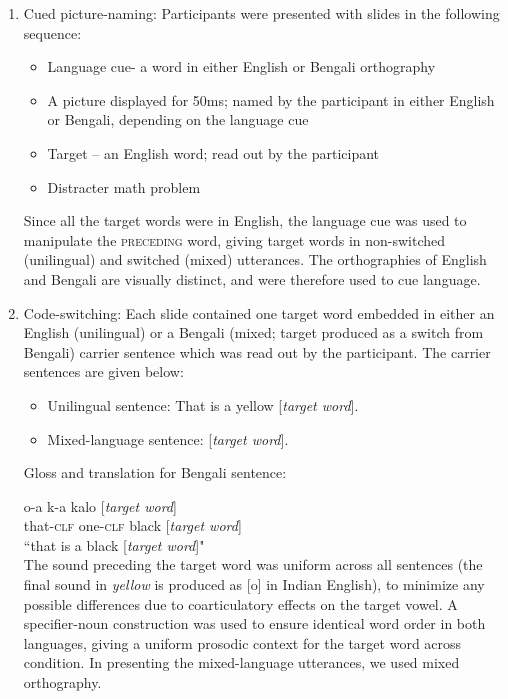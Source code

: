 \documentclass[12 pt]{article}
\begin{document}
\begin{enumerate}[]
	\item Cued picture-naming: Participants were presented with slides in the following sequence:
	\begin{itemize}
		\item Language cue- a word in either English or Bengali orthography
		\item A picture displayed for 50ms; named by the participant in either English or Bengali, depending on the language cue 
		\item Target -- an English word; read out by the participant
		\item Distracter math problem
	\end{itemize}
	Since all the target words were in English, the language cue was used to manipulate the \textsc{preceding} word, giving target words in non-switched (unilingual) and switched (mixed) utterances. The orthographies of English and Bengali are visually distinct, and were therefore used to cue language.
	
	\item Code-switching: Each slide contained one target word embedded in either an English (unilingual) or a Bengali (mixed; target produced as a switch from Bengali) carrier sentence which was read out by the participant. The carrier sentences are given below:
	\begin{itemize}
		\item Unilingual sentence: That is a yellow [\textit{target word}].
		\item Mixed-language sentence:  [\textit{target word}]. 
	\end{itemize}
	
Gloss and translation for Bengali sentence:

o-a \qquad \textipa{\ae}k-a \quad kalo [\textit{target word}]\\
that-\textsc{clf}  one-\textsc{clf}  black [\textit{target word}]\\
``that is a black [\textit{target word}]"\\
	
The sound preceding the target word was uniform across all sentences (the final sound in \textit{yellow} is produced as [o] in Indian English), to minimize any possible differences due to coarticulatory effects on the target vowel. A specifier-noun construction was used to ensure identical word order in both languages, giving a uniform prosodic context for the target word across condition. In presenting the mixed-language utterances, we used mixed orthography. \\
	
\end{enumerate}
\end{document}
